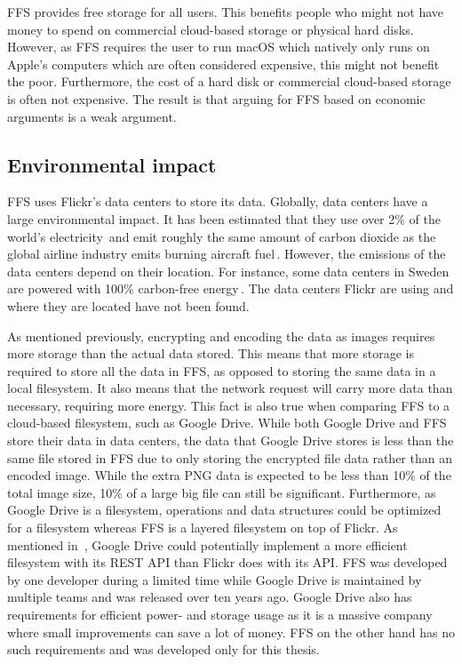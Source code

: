 \gls{FFS} provides free storage for all users. This benefits people who might not have money to spend on commercial \mbox{cloud-based} storage or physical hard disks. However, as \gls{FFS} requires the user to run macOS which natively only runs on Apple's computers which are often considered expensive, this might not benefit the poor. Furthermore, the cost of a hard disk or commercial \mbox{cloud-based} storage is often not expensive. The result is that arguing for \gls{FFS} based on economic arguments is a weak argument.

\subsection{Environmental impact}
\label{subsec:imp_env}
\gls{FFS} uses Flickr's data centers to store its data. Globally, data centers have a large environmental impact. It has been estimated that they use over 2\% of the world's electricity\,\cite{mcleanDataCentersGenerate2020} and emit roughly the same amount of carbon dioxide as the global airline industry emits burning aircraft fuel\,\cite{pearceEnergyHogsCan}. However, the emissions of the data centers depend on their location. For instance, some data centers in Sweden are powered with 100\% carbon-free energy\,\cite{cappellaSwedenSustainableData2022,unfcccEcoDataCenterSwedenUNFCCC}. The data centers Flickr are using and where they are located have not been found.

As mentioned previously, encrypting and encoding the data as images requires more storage than the actual data stored. This means that more storage is required to store all the data in \gls{FFS}, as opposed to storing the same data in a local filesystem. It also means that the network request will carry more data than necessary, requiring more energy. This fact is also true when comparing \gls{FFS} to a \mbox{cloud-based} filesystem, such as Google Drive. While both Google Drive and \gls{FFS} store their data in data centers, the data that Google Drive stores is less than the same file stored in \gls{FFS} due to only storing the encrypted file data rather than an encoded image. While the extra PNG data is expected to be less than 10\% of the total image size, 10\% of a large big file can still be significant. Furthermore, as Google Drive is a filesystem, operations and data structures could be optimized for a filesystem whereas \gls{FFS} is a layered filesystem on top of Flickr. As mentioned in~, Google Drive could potentially implement a more efficient filesystem with its REST \gls{API} than Flickr does with its \gls{API}. \gls{FFS} was developed by one developer during a limited time while Google Drive is maintained by multiple teams and was released over ten years ago. Google Drive also has requirements for efficient power- and storage usage as it is a massive company where small improvements can save a lot of money. \gls{FFS} on the other hand has no such requirements and was developed only for this thesis.

